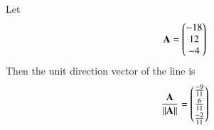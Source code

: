 Let
\begin{align}
	\mathbf{A} =\begin{pmatrix}-18\\12\\-4\end{pmatrix}
\end{align}
Then the unit direction vector of the line is
\begin{align}
		\frac{\mathbf{A}}{\left\lVert\mathbf{A}\right\rVert} =
\begin{pmatrix}\frac{-9}{11}\\[2pt] \frac{6}{11}\\[2pt] \frac{-2}{11}\end{pmatrix}
\end{align}
